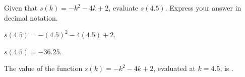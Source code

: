 \documentclass{ximera}
\begin{document}

\begin{exercise}
Given that $s(k)=-k^2-4 k+2$, evaluate $s(4.5)$. Express your answer in decimal notation.
\begin{solution}
\begin{hint}
$s(4.5)=-(4.5)^2-4 (4.5)+2$.
\end{hint}
\begin{hint}
$s(4.5)=-36.25$.
\end{hint}
The value of the function $s(k)=-k^2-4 k+2$, evaluated at $k=4.5$, is .
\end{solution}
\end{exercise}
\end{document}
